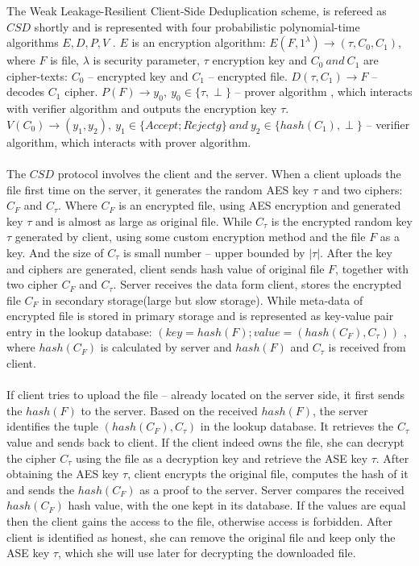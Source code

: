 \documentclass[12pt]{article}
\begin{document}
The Weak Leakage-Resilient Client-Side Deduplication scheme, is refereed as $CSD$ shortly and is represented with four probabilistic polynomial-time algorithms $E, D, P, V$ .  $E$ is an encryption algorithm: $E(F,1^\lambda) 	\rightarrow (\tau, C_0, C_1)$, where $F$ is file, $\lambda$ is security parameter, $\tau$ encryption key and $C_0\ and\ C_1$ are cipher-texts: $C_0$ -- encrypted key and $C_1$ -- encrypted file. $D(\tau,C_1) \rightarrow F $ -- decodes $C_1$ cipher. $P(F) \rightarrow y_0,\  y_0 \in \{\tau,\perp\} $ -- prover algorithm , which interacts with verifier algorithm and outputs the encryption key $\tau$. $V(C_0) \rightarrow (y_1,y_2),\ y_1 \in \{Accept; Rejectg\}\ and\ y_2 \in \{hash(C_1),\perp \}$ -- verifier algorithm, which interacts with prover algorithm.\\\\
The $CSD$ protocol involves the client and the server. When a client uploads the file first time on the server, it generates the random AES\cite{AES} key $\tau$ and two ciphers: $C_F$ and $C_\tau$. Where $C_F$ is an encrypted file, using AES encryption and generated  key $\tau$  and is almost as large as original file. While  $C_\tau$ is the encrypted random key $\tau$ generated by client, using some custom encryption method and the file $F$ as a key. And the size of $C_\tau$ is small number -- upper bounded by $|\tau|$. After the key and ciphers are generated, client sends hash value of original file $F$, together with two cipher $C_F$ and $C_\tau$.  Server receives the data form client, stores the encrypted file $C_F$ in secondary storage(large but slow storage). While meta-data of encrypted file is stored in primary storage and is represented as key-value pair entry in the lookup database: $(key = hash(F); value = (hash(C_F), C_\tau))$ , where $hash(C_F)$ is calculated by server and $hash(F)$ and $C_\tau$ is received from client.\\\\
If client tries to upload the file -- already located on the server side, it first sends the $hash(F)$ to the server.  Based on the received $hash(F)$, the server identifies  the tuple $(hash(C_F),C_\tau)$ in the lookup database. It retrieves the $C_\tau$ value and sends back to client. If the client indeed owns the file, she can decrypt the cipher $C_\tau$ using the file as a decryption key and retrieve the ASE key $\tau$. After obtaining the AES key $\tau$, client encrypts the original file, computes the hash of it and sends the $hash(C_F)$ as a proof to the server. Server compares the received $hash(C_F)$ hash value, with the one kept in its database. If the values are equal then the client gains the access to the file, otherwise access is forbidden. After client is identified as honest, she can remove the original file and keep only the ASE key $\tau$, which she will use later for decrypting the downloaded file.\\\\
\end{document}
